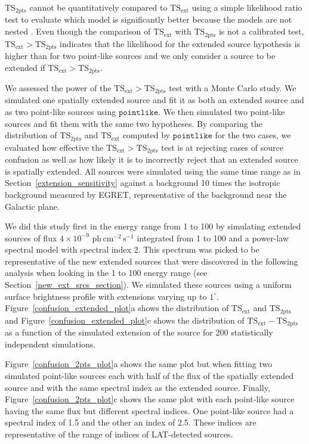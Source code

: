 \documentclass[12pt,preprint]{aastex}
\newcommand{\gev}{\text{GeV}\xspace}
\newcommand{\phflux}{\ensuremath{\text{ph}\,\text{cm}^{-2}\,\text{s}^{-1}}\xspace}
\newcommand{\tsext}{{\ensuremath{\text{TS}_{\text{ext}}}}\xspace}
\newcommand{\tsinc}{\ensuremath{\text{TS}_{\text{2pts}}}\xspace}
\newcommand{\pointlike}{\ensuremath{\mathtt{pointlike}}\xspace}
\newcommand{\degree}{^\circ\xspace}
\begin{document}
\tsinc cannot be quantitatively compared to \tsext using a simple
likelihood ratio test to evaluate which model is significantly better
because the models are not nested \citep{statistics_with_care}.
Even though the comparison of \tsext with \tsinc is not a calibrated
test, $\tsext>\tsinc$ indicates that the likelihood for the extended
source hypothesis is higher than for two point-like sources and we only
consider a source to be extended if $\tsext>\tsinc$.

We assessed the power of the $\tsext>\tsinc$ test with a Monte Carlo
study.  We simulated one spatially extended source and fit it as both
an extended source and as two point-like sources using \pointlike.
We then simulated two point-like sources and fit them with the same two
hypotheses. By comparing the distribution of \tsinc and \tsext computed by
\pointlike for the two cases, we evaluated how effective the $\tsext>\tsinc$
test is at rejecting cases of source confusion as well as how
likely it is to incorrectly reject that an extended source is spatially
extended.  All sources were simulated using the same time range as in
Section~\ref{extension_sensitivity} against a background 10 times the
isotropic background measured by EGRET, representative of the background
near the Galactic plane.

We did this study first in the energy range from 1 \gev to 100 \gev by
simulating extended sources of flux $4\times10^{-9}$ \phflux integrated
from 1 \gev to 100 \gev and a power-law spectral model with
spectral index 2.  This spectrum was picked to be representative of the
new extended sources that were discovered in the following analysis
when looking in the 1 \gev to 100 \gev energy range
(see Section~\ref{new_ext_srcs_section}).
We simulated these sources using a uniform surface brightness profile
with extensions varying
up to $1\degree$.  
Figure~\ref{confusion_extended_plot}a shows the distribution
of \tsext and \tsinc and 
Figure~\ref{confusion_extended_plot}c shows 
the distribution of $\tsext-\tsinc$ as a
function of the simulated extension of the source
for 200 statistically independent simulations.


Figure~\ref{confusion_2pts_plot}a shows the same plot but when fitting
two simulated point-like sources each with half of the flux of
the spatially extended source and with the same spectral index as the
extended source.  Finally, Figure~\ref{confusion_2pts_plot}c shows the same
plot with each point-like source having the same flux but different
spectral indices.  One point-like source had a spectral index of 1.5
and the other an index of 2.5.
These indices are representative of the range of indices of LAT-detected
sources.
\end{document}
